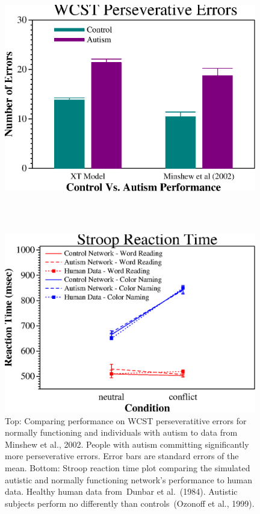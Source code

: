 \begin{figure}
\begin{center}
	\includegraphics[width=110mm]{graphs/wcst.ps}
                                                                
\textcolor{white}{\\--------------------------------\\}

	\includegraphics[width=110mm]{graphs/stroop.ps}
\end{center}
\caption{Top: Comparing performance on WCST perseveratitive errors for normally functioning and individuals with autism to data from Minshew et al., 2002. People with autism committing significantly more perseverative errors. Error bars are standard errors of the mean. Bottom: Stroop reaction time plot comparing the simulated autistic and normally functioning network's performance to human data. Healthy human data from~Dunbar et al.~(1984). Autistic subjects perform no differently than controls~(Ozonoff et al., 1999).} 
\label{ed-results-figure}
\end{figure} 

